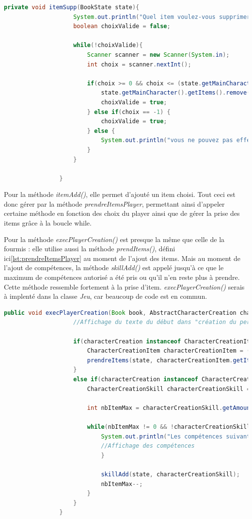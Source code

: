 			\begin{lstlisting}[gobble=16, language=java, caption=itemSupp()]
				private void itemSupp(BookState state){
					System.out.println("Quel item voulez-vous supprimer ?");
					boolean choixValide = false;

					while(!choixValide){
						Scanner scanner = new Scanner(System.in);
						int choix = scanner.nextInt();

						if(choix >= 0 && choix <= (state.getMainCharacter().getItems().size()-1)){
							state.getMainCharacter().getItems().remove(choix);
							choixValide = true;
						} else if(choix == -1) {
							choixValide = true;
						} else {
							System.out.println("vous ne pouvez pas effectuer ce choix");
						}
					}

				}
			\end{lstlisting}

			Pour la méthode \textit{itemAdd()}, elle permet d'ajouté un item choisi.
			Tout ceci est donc gérer par la méthode \textit{prendreItemsPlayer}, permettant ainsi d'appeler certaine méthode en fonction des choix du player ainsi que de gérer la prise des items grâce à la boucle while.


			Pour la méthode \textit{execPlayerCreation()} est presque la même que celle de la fourmis : elle utilise aussi la méthode \textit{prendItems()}, défini ici\ref{lst:prendreItemsPlayer} au moment de l'ajout des items. Mais au moment de l'ajout de compétences, la méthode \textit{skillAdd()} est appelé jusqu'à ce que le maximum de compétences autorisé a été pris ou qu'il n'en reste plus à prendre. Cette méthode ressemble fortement à la prise d'item. \textit{execPlayerCreation()} serais à implenté dans la classe \textit{Jeu}, car beaucoup de code est en commun.\\

			\begin{lstlisting}[gobble=16, language=java, caption=execPlayerCreation() du Player]
				public void execPlayerCreation(Book book, AbstractCharacterCreation characterCreation, BookState state){
					//Affichage du texte du début dans "création du personnage"

					if(characterCreation instanceof CharacterCreationItem){
						CharacterCreationItem characterCreationItem = (CharacterCreationItem) characterCreation;
						prendreItems(state, characterCreationItem.getItemLinks(), characterCreationItem.getAmountToPick());
					}
					else if(characterCreation instanceof CharacterCreationSkill){
						CharacterCreationSkill characterCreationSkill = (CharacterCreationSkill) characterCreation;

						int nbItemMax = characterCreationSkill.getAmountToPick();

						while(nbItemMax != 0 && !characterCreationSkill.getSkillLinks().isEmpty()){
							System.out.println("Les compétences suivant sont disponible:");
							//Affichage des compétences
							}

							skillAdd(state, characterCreationSkill);
							nbItemMax--;
						}
					}
				}
				\end{lstlisting}


